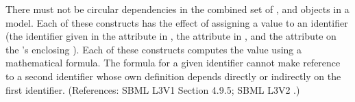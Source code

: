 There must not be circular dependencies in the combined set of
\InitialAssignment, \AssignmentRule and \KineticLaw objects in a model.
Each of these constructs has the effect of assigning a value to an
identifier (\ie the identifier given in the attribute  in
\InitialAssignment, the attribute  in \AssignmentRule, and
the attribute  on the \KineticLaw's enclosing \Reaction).  Each
of these constructs computes the value using a mathematical formula.  The
formula for a given identifier cannot make reference to a second identifier
whose own definition depends directly or indirectly on the first
identifier.  (References: SBML L3V1 Section 4.9.5; SBML L3V2 .)
